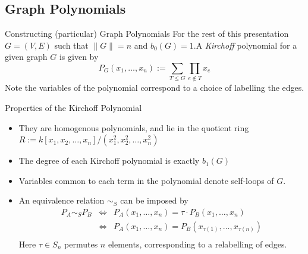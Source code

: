 \documentclass{beamer}
\begin{document}
\subsection{Graph Polynomials}
\begin{frame}{Constructing (particular) Graph Polynomials}
    For the rest of this presentation $G=(V,E)$ such that $\|G\| = n$ and $b_0(G) = 1$.\pause A \textit{Kirchoff} polynomial \cites{stanley_spanning_1998,krajewski_topological_2010} for a given graph $G$ is given by $$P_G(x_1, \ldots, x_n):= \sum_{T \leq G} \prod_{e \notin T} x_e$$Note the variables of the polynomial correspond to a choice of labelling the edges.
\end{frame}
\begin{frame}{Properties of the Kirchoff Polynomial}
    \begin{itemize}
        \item<1-> They are homogenous polynomials, and lie in the quotient ring $R:= k[x_1, x_2, \ldots , x_n]/(x_1^2, x_2^2, \ldots , x_n^2)$
        \item<2-> The degree of each Kirchoff polynomial is exactly $b_1(G)$
        \item<3-> Variables common to each term in the polynomial denote self-loops of $G$.
        \item<4-> An equivalence relation $\sim_S$ can be imposed by \begin{eqnarray*}
            P_A \sim_S P_B &\iff& P_A(x_1, \ldots, x_n) = \tau \cdot P_B(x_1, \ldots, x_n) \\
            &\iff& P_A(x_1, \ldots, x_n) = P_B(x_{\tau(1)}, \ldots, x_{\tau(n)}) \\
        \end{eqnarray*}Here $\tau \in S_n$ permutes $n$ elements, corresponding to a relabelling of edges.
    \end{itemize}
\end{frame}
\end{document}
